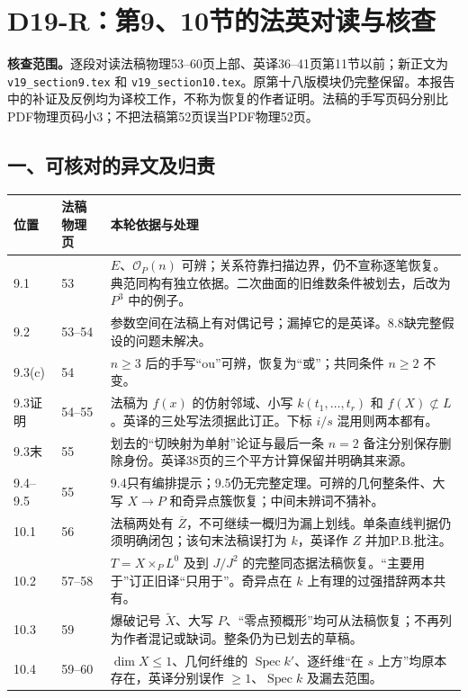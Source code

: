 \begingroup
\section*{D19-R：第9、10节的法英对读与核查}

\noindent\textbf{核查范围。}逐段对读法稿物理53--60页上部、英译36--41页第11节以前；新正文为 \texttt{v19\_section9.tex} 和 \texttt{v19\_section10.tex}。原第十八版模块仍完整保留。本报告中的补证及反例均为译校工作，不称为恢复的作者证明。法稿的手写页码分别比PDF物理页码小3；不把法稿第52页误当PDF物理52页。

\subsection*{一、可核对的异文及归责}
\begin{longtable}{p{}p{}p{}}
\toprule
位置 & 法稿物理页 & 本轮依据与处理\\\midrule\endhead
9.1 & 53 & $E$、$\mathcal O_P(n)$ 可辨；关系符靠扫描边界，仍不宣称逐笔恢复。典范同构有独立依据。二次曲面的旧维数条件被划去，后改为 $P^3$ 中的例子。\\
9.2 & 53--54 & 参数空间在法稿上有对偶记号；漏掉它的是英译。8.8缺完整假设的问题未解决。\\
9.3(c) & 54 & $n\ge3$ 后的手写“ou”可辨，恢复为“或”；共同条件 $n\ge2$ 不变。\\
9.3证明 & 54--55 & 法稿为 $f(x)$ 的仿射邻域、小写 $k(t_1,\ldots,t_r)$ 和 $f(X)\not\subset L$。英译的三处写法须据此订正。下标 $i/s$ 混用则两本都有。\\
9.3末 & 55 & 划去的“切映射为单射”论证与最后一条 $n=2$ 备注分别保存删除身份。英译38页的三个平方计算保留并明确其来源。\\
9.4--9.5 & 55 & 9.4只有编排提示；9.5仍无完整定理。可辨的几何整条件、大写 $X\to P$ 和奇异点簇恢复；中间未辨词不猜补。\\
10.1 & 56 & 法稿两处有 $\overline Z$，不可继续一概归为漏上划线。单条直线判据仍须明确闭包；该句末法稿误打为 $k$，英译作 $Z$ 并加P.B.批注。\\
10.2 & 57--58 & $T=X\times_P L^0$ 及到 $J/J^2$ 的完整同态据法稿恢复。“主要用于”订正旧译“只用于”。奇异点在 $k$ 上有理的过强措辞两本共有。\\
10.3 & 59 & 爆破记号 $\widetilde X$、大写 $P$、“零点预概形”均可从法稿恢复；不再列为作者混记或缺词。整条仍为已划去的草稿。\\
10.4 & 59--60 & $\dim X\le1$、几何纤维的 $\operatorname{Spec}k'$、逐纤维“在 $s$ 上方”均原本存在，英译分别误作 $\ge1$、$\operatorname{Spec}k$ 及漏去范围。\\
\bottomrule
\end{longtable}

